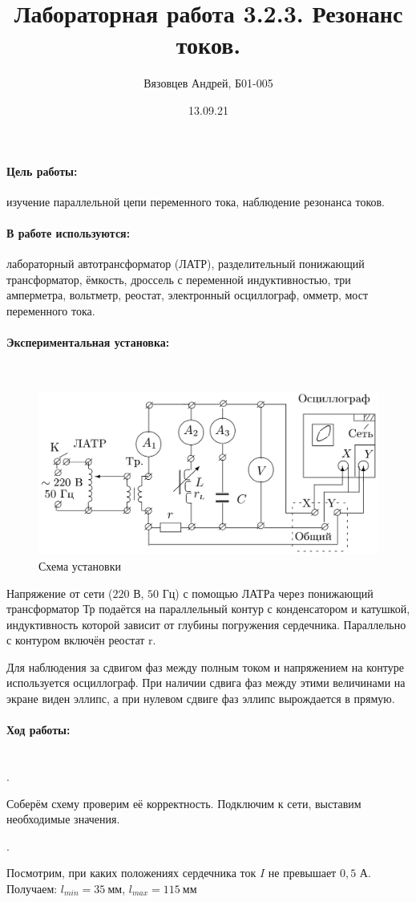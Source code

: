\documentclass[a4paper, 12pt]{article}
\author{Вязовцев Андрей, Б01-005} %
\date{13.09.21}
\title{Лабораторная работа 3.2.3. Резонанс токов.}
\newcommand{\parag}[1]{\paragraph*{#1:}}
\newcounter{Points}
\newcommand{\point}{\arabic{Points}. \addtocounter{Points}{1}}
\begin{document}
\maketitle

\parag {Цель работы} изучение параллельной цепи переменного тока, наблюдение резонанса токов.

\parag {В работе используются} лабораторный автотрансформатор (ЛАТР), разделительный понижающий трансформатор, ёмкость, дроссель с переменной индуктивностью, три амперметра, вольтметр, реостат, электронный осциллограф, омметр, мост переменного тока.


\parag {Экспериментальная установка} ~

\begin{figure}[!h]
    \includegraphics[scale = 0.2]{Workplace}
    \centering
    \caption{Схема установки}
\end{figure}

Напряжение от сети ($220$ В, $50$ Гц) с помощью ЛАТРа через понижающий трансформатор Тр подаётся на параллельный контур с конденсатором и катушкой, индуктивность которой зависит от глубины погружения сердечника. Параллельно с контуром включён реостат r.

Для наблюдения за сдвигом фаз между полным током и напряжением на контуре используется осциллограф. При наличии сдвига фаз между этими величинами на экране виден эллипс, а при нулевом сдвиге фаз эллипс вырождается в прямую.

\parag {Ход работы} ~\\

\point Соберём схему проверим её корректность. Подключим к сети, выставим необходимые значения.

\point Посмотрим, при каких положениях сердечника ток $I$ не превышает $0,5$ А. Получаем: $l_{min} = 35~мм$, $l_{max} = 115~мм$
\end{document}
